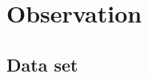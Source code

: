 \documentclass[fleqn,usenatbib]{mnras}
\begin{document}

\section{Observation}
\label{sec:2}
\subsection{Data set}
\end{document}
